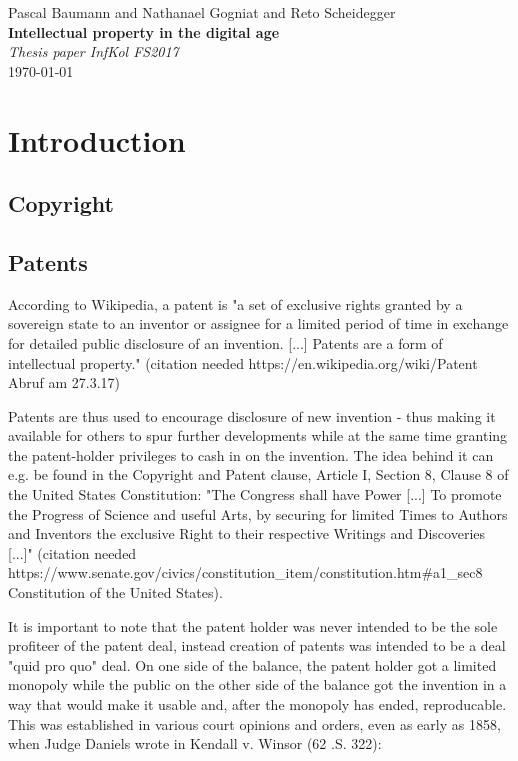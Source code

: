 \documentclass[a4paper]{report}
\newcommand*{\titleAP}{\begingroup %
	\centering
	\vspace*{\baselineskip} %
	
	{\Large Pascal Baumann} and {\Large Nathanael Gogniat} and {\Large Reto Scheidegger}\\[0.167\textheight] %
	
	{\Huge\bfseries Intellectual property in the digital age}\\[\baselineskip]
	
	{\Large \textit{Thesis paper InfKol FS2017}}\\
	\today
	
	\vspace*{3\baselineskip} %
	\endgroup}
\begin{document}
\titleAP

\begin{abstract}
	\blindtext
\end{abstract}
\newpage

\tableofcontents

\newpage

\chapter{Introduction}
\label{ch:Intro}

\section{Copyright}
\label{sec:Copyright}

\section{Patents}
\label{sec:Patents}
According to Wikipedia, a patent is "a set of exclusive rights granted by a sovereign state to an inventor or assignee for a limited period of time in exchange for detailed public disclosure of an invention. [...]  Patents are a form of intellectual property." (citation needed https://en.wikipedia.org/wiki/Patent Abruf am 27.3.17)

Patents are thus used to encourage disclosure of new invention - thus making it available for others to spur further developments while at the same time granting the patent-holder privileges to cash in on the invention. The idea behind it can e.g. be found in the Copyright and Patent clause, Article I, Section 8, Clause 8 of the United States Constitution: "The Congress shall have Power [...] To promote the Progress of Science and useful Arts, by securing for limited Times to Authors and Inventors the exclusive Right to their respective Writings and Discoveries [...]" (citation needed https://www.senate.gov/civics/constitution_item/constitution.htm#a1_sec8 Constitution of the United States).

It is important to note that the patent holder was never intended to be the sole profiteer of the patent deal, instead creation of patents was intended to be a deal "quid pro quo" deal. On one side of the balance, the patent holder got a limited monopoly while the public on the other side of the balance got the invention in a way that would make it usable and, after the monopoly has ended, reproducable. This was established in various court opinions and orders, even as early as 1858, when Judge Daniels wrote in Kendall v. Winsor (62 .S. 322): 
\end{document}
